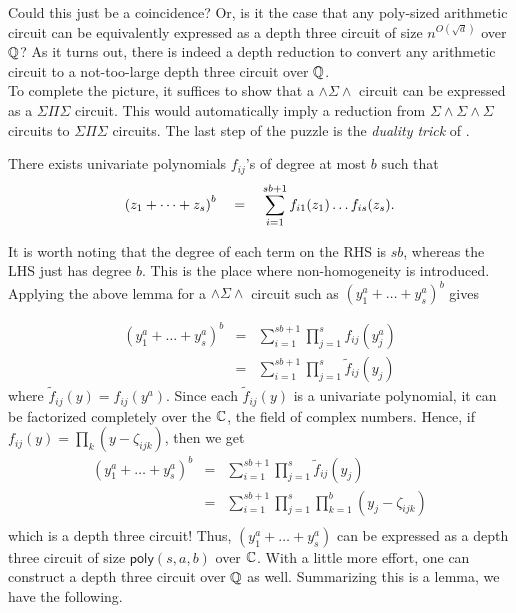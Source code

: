 \documentclass{beatcs}
\newcommand{\poly}{\mathsf{poly}}
\newcommand{\SESES}{\Sigma\!\wedge\!\Sigma\!\wedge\!\Sigma}
\begin{document}
Could this just be a coincidence? Or, is it the case that any poly-sized arithmetic circuit can be equivalently expressed as a depth three circuit of size $n^{O(\sqrt{d})}$ over $\mathbb{Q}$? As it turns out, there is indeed a depth reduction to convert any arithmetic circuit to a not-too-large depth three circuit over $\mathbb{Q}$. \\

To complete the picture, it suffices to show that a $\wedge\Sigma\wedge$ circuit can be expressed as a $\Sigma\Pi\Sigma$ circuit. This would automatically imply a reduction from $\SESES$ circuits to $\Sigma\Pi\Sigma$ circuits. The last step of the puzzle is the \emph{duality trick} of \cite{sax08}. 

\begin{lemma}\label{lem:duality} There exists univariate polynomials $f_{ij}$'s of degree at most $b$ such that
$$
\left(z_1 + \dots + z_s\right)^b \quad = \quad \sum_{i=1}^{sb+1} f_{i1}(z_1)\dots f_{is}(z_s).
$$
\end{lemma}

It is worth noting that the degree of each term on the RHS is $sb$, whereas the LHS just has degree $b$. This is the place where non-homogeneity is introduced. Applying the above lemma for a $\wedge\Sigma\wedge$ circuit such as $(y_1^a + \dots + y_s^a)^b$ gives

\begin{eqnarray*}
(y_1^a + \dots + y_s^a)^b & = & \sum_{i=1}^{sb+1} \prod_{j=1}^s f_{ij}(y_j^a)\\
 & = & \sum_{i=1}^{sb+1} \prod_{j=1}^s \tilde{f}_{ij}(y_j)
\end{eqnarray*}
where $\tilde{f}_{ij}(y) = f_{ij}(y^a)$. Since each $\tilde{f}_{ij}(y)$ is a univariate polynomial, it can be factorized completely over the $\mathbb{C}$, the field of complex numbers. Hence, if $f_{ij}(y) = \prod_k (y - \zeta_{ijk})$, then we get
\begin{eqnarray*}
(y_1^a + \dots + y_s^a)^b & = & \sum_{i=1}^{sb+1} \prod_{j=1}^s \tilde{f}_{ij}(y_j)\\
&= & \sum_{i=1}^{sb+1} \prod_{j=1}^s \prod_{k=1}^b (y_j - \zeta_{ijk})\\
\end{eqnarray*}
which is a depth three circuit! Thus, $(y_1^a + \dots + y_s^a)$ can be expressed as a depth three circuit of size $\poly(s,a,b)$ over $\mathbb{C}$. With a little more effort, one can construct a depth three circuit over $\mathbb{Q}$ as well. Summarizing this is a lemma, we have the following. 
\end{document}
